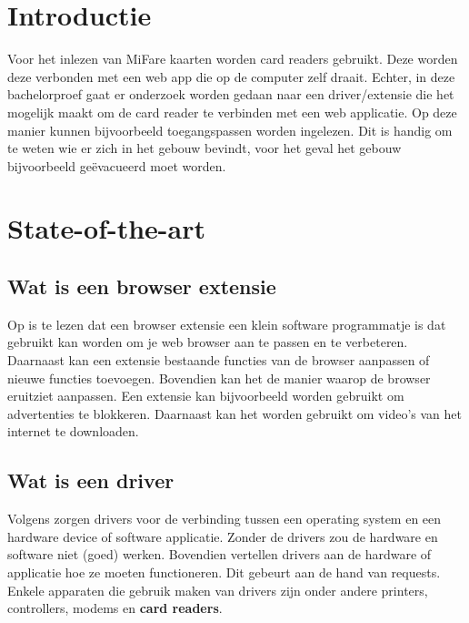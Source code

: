 
\section{Introductie}%
\label{sec:introductie}

Voor het inlezen van MiFare kaarten worden card readers gebruikt. Deze worden deze verbonden met een web app die op de computer zelf draait. Echter, in deze bachelorproef gaat er onderzoek worden gedaan naar een driver/extensie die het mogelijk maakt om de card reader te verbinden met een web applicatie. Op deze manier kunnen bijvoorbeeld toegangspassen worden ingelezen. Dit is handig om te weten wie er zich in het gebouw bevindt, voor het geval het gebouw bijvoorbeeld geëvacueerd moet worden.


\section{State-of-the-art}%
\label{sec:state-of-the-art}

\subsection{Wat is een browser extensie}
Op \textcite{Desktop.com} is te lezen dat een browser extensie een klein software programmatje is dat gebruikt kan worden om je web browser aan te passen en te verbeteren. Daarnaast kan een extensie bestaande functies van de browser aanpassen of nieuwe functies toevoegen. Bovendien kan het de manier waarop de browser eruitziet aanpassen.
Een extensie kan bijvoorbeeld worden gebruikt om advertenties te blokkeren. Daarnaast kan het worden gebruikt om video's van het internet te downloaden.


\subsection{Wat is een driver}
Volgens \textcite{Webopedia} zorgen drivers voor de verbinding tussen een operating system en een hardware device of software applicatie. Zonder de drivers zou de hardware en software niet (goed) werken. Bovendien vertellen drivers aan de hardware of applicatie hoe ze moeten functioneren. Dit gebeurt aan de hand van requests. Enkele apparaten die gebruik maken van drivers zijn onder andere printers, controllers, modems en \textbf{card readers}.

